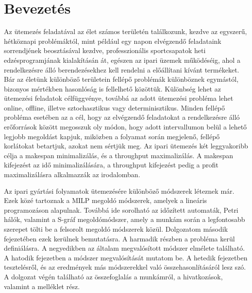 \chapter{Bevezetés}
Az ütemezés feladatával az élet számos területén találkozunk, kezdve az egyszerű, hétköznapi problémáktól, mint például egy napon elvégzendő feladataink sorrendjének beosztásával kezdve, professzionális sportcsapatok heti edzésprogramjának kialakításán át, egészen az ipari üzemek működéséig, ahol a rendelkezésre álló berendezésekhez kell rendelni a előállítani kívánt termékeket. Bár az életünk különböző területein fellépő problémák különböznek egymástól, bizonyos mértékben hasonlóság is fellelhető közöttük. Különbség lehet az ütemezési feladatok célfüggvénye, továbbá az adott ütemezési probléma lehet online, offline, illetve sztochasztikus vagy determinisztikus. Minden fellépő probléma esetében az a cél, hogy az elvégzendő feladatokat a rendelkezésre álló erőforrások között megosszuk oly módon, hogy adott intervallumon belül a lehető legjobb megoldást kapjuk, miközben a folyamat során megjelenő, fellépő korlátokat betartjuk, azokat nem sértjük meg. Az ipari ütemezés két leggyakoribb célja a makespan minimalizálás, és a throughput maximalizálás. A makespan kifejezést az idő minimalizálására, a throughput kifejezést pedig a profit maximalizálásra alkalmazzák az irodalomban.

Az ipari gyártási folyamatok ütemezésére különböző módszerek léteznek már.   Ezek közé tartoznak a MILP megoldó módszerek, amelyek a lineáris programozáson alapulnak. Továbbá ide sorolható az időzített automaták, Petri hálók, valamint a S-gráf megoldómódszer, amely a munkám során a legfontosabb szerepet tölti be a felsorolt megoldó módszerek közül. Dolgozatom második fejezetében ezek kerülnek bemutatásra. A harmadik részben a probléma kerül definiálásra. A negyedikben az általam megvalósított módszer elmélete található. A hatodik fejezetben a módszer megvalósítását mutatom be. A hetedik fejezetben tesztelésről, és az eredmények más módszerekkel való összehasonlításáról lesz szó. A dolgozat végén található az összefoglalás a munkámról, a hivatkozások, valamint a melléklet rész.
